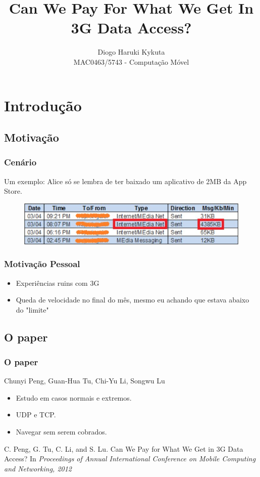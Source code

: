 \documentclass[brazil]{beamer}
\title{Can We Pay For What We Get In 3G Data Access?}
\author{Diogo Haruki Kykuta \\ MAC0463/5743 - Computação Móvel}
\date{}
\begin{document}
\frame{\titlepage}

\section{Introdução}



\subsection{Motivação}
\begin{frame}[fragile]
    \frametitle{Cenário}
    Um exemplo: Alice só se lembra de ter baixado um aplicativo de 2MB da App Store.

    \begin{figure}
    \begin{center}
        \includegraphics[scale=0.5]{images/contaAlice.jpg}
    \end{center}
    \end{figure}
\end{frame}

\begin{frame}[fragile]
    \frametitle{Motivação Pessoal}
    \begin{itemize}
        \item Experiências ruins com 3G
        \item Queda de velocidade no final do mês, mesmo eu achando que estava abaixo do "limite"
    \end{itemize}
\end{frame}

\subsection{O paper}
\begin{frame}[fragile]
    \frametitle{O paper}
    \begin{center}
        Chunyi Peng, Guan-Hua Tu, Chi-Yu Li, Songwu Lu
    \end{center}
    \vspace{0.4cm}
    \begin{itemize}
        \item Estudo em casos normais e extremos.
        \item UDP e TCP.
        \item Navegar sem serem cobrados.

    \end{itemize}

    \tiny{C. Peng, G. Tu, C. Li, and S. Lu. Can We Pay for What We Get in 3G
        Data Access? In \textit{Proceedings of Annual International Conference on Mobile Computing and Networking, 2012}}
\end{frame}
\end{document}
